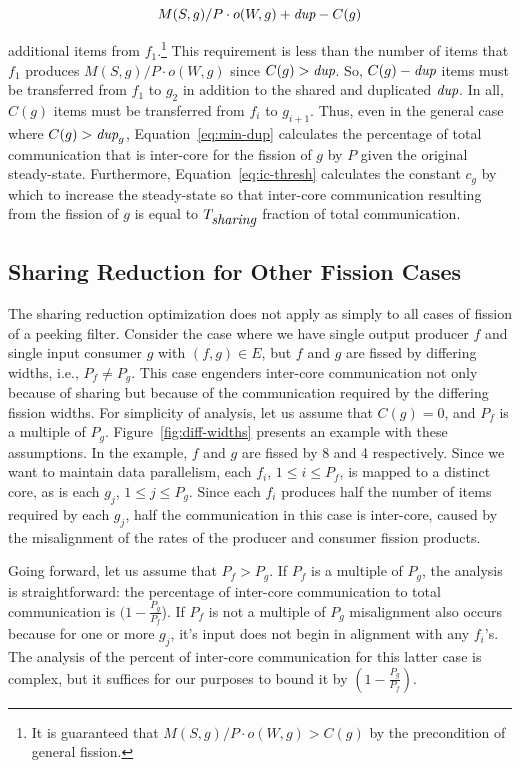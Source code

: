 \[ M(S, g)/P \cdot o(W, g) + \mbox{\it dup} - C(g)\]

\noindent additional items from $f_1$.\footnote{It is guaranteed that
  $M(S, g)/P \cdot o(W, g) > C(g)$ by the precondition of general
  fission.} This requirement is less than the number of items that
$f_1$ produces $M(S, g)/P \cdot o(W, g)$ since $C(g) > \mbox{\it dup}$. So,
$C(g) - \mbox{\it dup}$ items must be transferred from $f_1$ to $g_2$ in
addition to the shared and duplicated $\mbox{\it dup}$. In all, $C(g)$ items
must be transferred from $f_i$ to $g_{i+1}$. Thus, even in the general
case where $C(g) > \mbox{\it dup}_g$, Equation~\ref{eq:min-dup} calculates
the percentage of total communication that is inter-core for the
fission of $g$ by $P$ given the original steady-state. Furthermore,
Equation~\ref{eq:ic-thresh} calculates the constant $c_g$ by which to
increase the steady-state so that inter-core communication resulting
from the fission of $g$ is equal to $T_{\mbox{\it sharing}}$ fraction of
total communication.

\subsection{Sharing Reduction for Other Fission Cases}

The sharing reduction optimization does not apply as simply to all
cases of fission of a peeking filter.  Consider the case where we have
single output producer $f$ and single input consumer $g$ with $(f,g)
\in E$, but $f$ and $g$ are fissed by differing widths, i.e., $P_f \ne
P_g$.  This case engenders inter-core communication not only because
of sharing but because of the communication required by the differing
fission widths.  For simplicity of analysis, let us assume that $C(g)
= 0$, and $P_f$ is a multiple of $P_g$. Figure~\ref{fig:diff-widths}
presents an example with these assumptions.  In the example, $f$ and
$g$ are fissed by 8 and 4 respectively.  Since we want to maintain
data parallelism, each $f_i$, $1 \le i \le P_f$, is mapped to a
distinct core, as is each $g_j$, $1 \le j \le P_g$.  Since each $f_i$
produces half the number of items required by each $g_j$, half the
communication in this case is inter-core, caused by the misalignment
of the rates of the producer and consumer fission products.

Going forward, let us assume that $P_f > P_g$.  If $P_f$ is a multiple
of $P_g$, the analysis is straightforward: the percentage of inter-core
communication to total communication is $(1 - \frac{P_g}{P_f}$). If $P_f$ is
not a multiple of $P_g$ misalignment also occurs because for one or
more $g_j$, it's input does not begin in alignment with any $f_i$'s.
The analysis of the percent of inter-core communication for this latter
case is complex, but it suffices for our purposes to bound it by
$(1 - \frac{P_g}{P_f})$.

